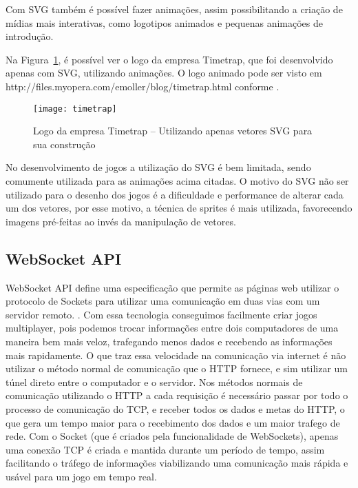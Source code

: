 Com SVG também é possível fazer animações, assim possibilitando a
criação de mídias mais interativas, como logotipos animados e pequenas
animações de introdução.

Na Figura~\ref{img:timetrap}, é possível ver o logo da empresa
Timetrap, que foi desenvolvido apenas com SVG, utilizando animações. O
logo animado pode ser visto em
http://files.myopera.com/emoller/blog/timetrap.html conforme \cite{svgtimetrap}.

\begin{figure}[H]
  \centering
	\texttt{[image: timetrap]}
  \caption{Logo da empresa Timetrap {--} Utilizando apenas vetores SVG para sua construção}
  \label{img:timetrap}
\end{figure}

\clearpage

No desenvolvimento de jogos a utilização do SVG é bem limitada, sendo
comumente utilizada para as animações acima citadas. O motivo do SVG
não ser utilizado para o desenho dos jogos é a dificuldade e
performance de alterar cada um dos vetores, por esse motivo,
a técnica de sprites é mais utilizada, favorecendo imagens pré-feitas
ao invés da manipulação de vetores.


\subsection{WebSocket API}

WebSocket API define uma especificação que permite as páginas web
utilizar o protocolo de Sockets para utilizar uma comunicação em duas
vias com um servidor remoto. \cite{w3cwebsockets}. Com essa tecnologia
conseguimos facilmente criar jogos multiplayer, pois podemos
trocar informações entre dois computadores de uma maneira bem mais
veloz, trafegando menos dados e recebendo as informações mais
rapidamente.
O que traz essa velocidade na comunicação via internet é não utilizar
o método normal de comunicação que o HTTP fornece, e sim utilizar um
túnel direto entre o computador e o servidor.
Nos métodos normais de comunicação utilizando o HTTP a cada requisição
é necessário passar por todo o processo de comunicação do TCP, e
receber todos os dados e metas do HTTP, o que gera um tempo maior para
o recebimento dos dados e um maior trafego de rede. Com o Socket (que
é criados pela funcionalidade de WebSockets), apenas uma conexão TCP é
criada e mantida durante um período de tempo, assim facilitando o
tráfego de informações viabilizando uma comunicação mais rápida e
usável para um jogo em tempo real.

